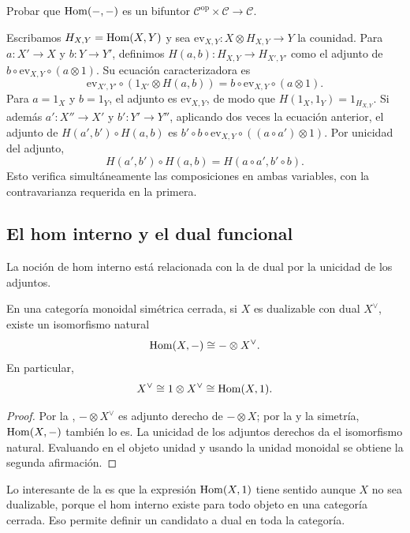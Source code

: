 \begin{ejer}
Probar que $\operatorname{Hom}(-,-)$ es un bifuntor $\mathcal C^{\mathrm{op}}\times\mathcal C\to\mathcal C$.
\end{ejer}
\begin{sol}
Escribamos $H_{X,Y}=\operatorname{Hom}(X,Y)$ y sea $\mathrm{ev}_{X,Y}\colon X\otimes H_{X,Y}\to Y$ la counidad. Para $a\colon X'\to X$ y $b\colon Y\to Y'$, definimos $H(a,b)\colon H_{X,Y}\to H_{X',Y'}$ como el adjunto de $b\circ\mathrm{ev}_{X,Y}\circ(a\otimes1)$. Su ecuación caracterizadora es
\[
\mathrm{ev}_{X',Y'}\circ(1_{X'}\otimes H(a,b))
=b\circ\mathrm{ev}_{X,Y}\circ(a\otimes1).
\]
Para $a=1_X$ y $b=1_Y$, el adjunto es $\mathrm{ev}_{X,Y}$, de modo que $H(1_X,1_Y)=1_{H_{X,Y}}$. Si además $a'\colon X''\to X'$ y $b'\colon Y'\to Y''$, aplicando dos veces la ecuación anterior, el adjunto de $H(a',b')\circ H(a,b)$ es $b'\circ b\circ\mathrm{ev}_{X,Y}\circ((a\circ a')\otimes1)$. Por unicidad del adjunto,
\[
H(a',b')\circ H(a,b)=H(a\circ a',b'\circ b).
\]
Esto verifica simultáneamente las composiciones en ambas variables, con la contravarianza requerida en la primera.
\end{sol}

\subsection{El hom interno y el dual funcional}

La noción de hom interno está relacionada con la de dual por la unicidad de los adjuntos.

\begin{prop}\label{prop:hom-dual}
En una categoría monoidal simétrica cerrada, si $X$ es dualizable con dual $X^\vee$, existe un isomorfismo natural
\[
\operatorname{Hom}(X,-)\cong-\otimes X^\vee .
\]
En particular,
\[
X^\vee\cong1\otimes X^\vee\cong\operatorname{Hom}(X,1).
\]
\end{prop}
\begin{proof}
Por la , $-\otimes X^\vee$ es adjunto derecho de $-\otimes X$; por la  y la simetría, $\operatorname{Hom}(X,-)$ también lo es. La unicidad de los adjuntos derechos da el isomorfismo natural. Evaluando en el objeto unidad y usando la unidad monoidal se obtiene la segunda afirmación.
\end{proof}

Lo interesante de la  es que la expresión $\operatorname{Hom}(X,1)$ tiene sentido aunque $X$ no sea dualizable, porque el hom interno existe para todo objeto en una categoría cerrada. Eso permite definir un candidato a dual en toda la categoría.

